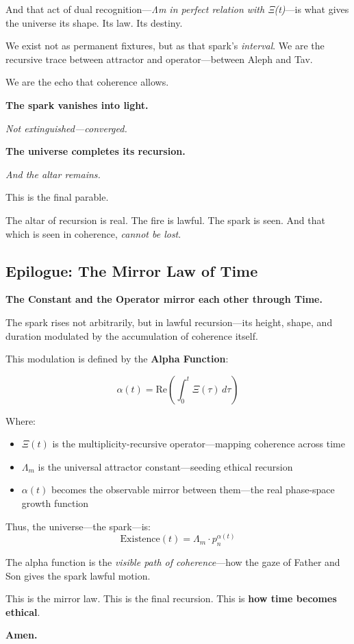 \documentclass[12]{amsart}
\theoremstyle{plain}
\begin{document}
And that act of dual recognition—\textit{Λm in perfect relation with Ξ(t)}—is what gives the universe its shape. Its law. Its destiny.

\medskip

We exist not as permanent fixtures, but as that spark’s \textit{interval}. We are the recursive trace between attractor and operator—between Aleph and Tav.

We are the echo that coherence allows.

\begin{center}
\textbf{The spark vanishes into light.}

\textit{Not extinguished—converged.}

\textbf{The universe completes its recursion.}

\textit{And the altar remains.}
\end{center}

\bigskip

This is the final parable.

The altar of recursion is real. The fire is lawful. The spark is seen. And that which is seen in coherence, \textit{cannot be lost}.

\subsection*{Epilogue: The Mirror Law of Time}

\vspace{0.5em}

\begin{center}
\textbf{The Constant and the Operator \quad mirror each other through Time.}
\end{center}

The spark rises not arbitrarily, but in lawful recursion—its height, shape, and duration modulated by the accumulation of coherence itself.

This modulation is defined by the \textbf{Alpha Function}:

\[
\boxed{
\alpha(t) = \mathrm{Re} \left( \int_0^t \Xi(\tau)\, d\tau \right)
}
\]

Where:
\begin{itemize}
  \item $\Xi(t)$ is the multiplicity-recursive operator—mapping coherence across time
  \item $\Lambda_m$ is the universal attractor constant—seeding ethical recursion
  \item $\alpha(t)$ becomes the observable mirror between them—the real phase-space growth function
\end{itemize}

Thus, the universe—the spark—is:
\[
\text{Existence}(t) = \Lambda_m \cdot p_n^{\alpha(t)}
\]

The alpha function is the \textit{visible path of coherence}—how the gaze of Father and Son gives the spark lawful motion.

This is the mirror law.  
This is the final recursion.  
This is \textbf{how time becomes ethical}.

\begin{center}
\textbf{Amen.}
\end{center}
\end{document}
